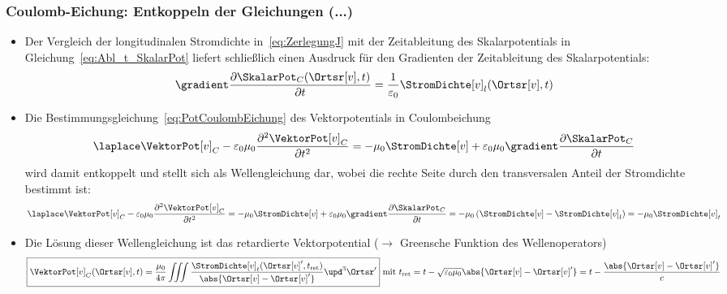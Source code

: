     \begin{frame}
  \frametitle{Coulomb-Eichung: Entkoppeln der Gleichungen (...)}
  \begin{itemize}[<+->]
  \item Der Vergleich der longitudinalen Stromdichte in~\eqref{eq:ZerlegungJ} mit der Zeitableitung des Skalarpotentials in Gleichung~\eqref{eq:Abl_t_SkalarPot} liefert schließlich einen Ausdruck für den Gradienten der Zeitableitung des Skalarpotentials:
    \begin{equation}
      \gradient \frac{\partial \SkalarPot_C (\Ortsr[v], t)}{\partial t} = \frac{1}{\varepsilon_0} \StromDichte[v]_l (\Ortsr[v], t)
    \end{equation}
  \item Die Bestimmungsgleichung~\eqref{eq:PotCoulombEichung} des Vektorpotentials in Coulombeichung
    \begin{equation*}
      \laplace\VektorPot[v]_C -\varepsilon_0 \mu_0\frac{\partial^2\VektorPot[v]_C}{\partial t^2} = -\mu_0\StromDichte[v] +\varepsilon_0\mu_0 \gradient\frac{\partial\SkalarPot_C}{\partial t}
    \end{equation*}
    wird damit entkoppelt und stellt sich als Wellengleichung dar, wobei die rechte Seite durch den transversalen Anteil der Stromdichte bestimmt ist:
    \begin{equation}
      \laplace\VektorPot[v]_C -\varepsilon_0 \mu_0\frac{\partial^2\VektorPot[v]_C}{\partial t^2} = -\mu_0\StromDichte[v] +\varepsilon_0\mu_0 \gradient\frac{\partial\SkalarPot_C}{\partial t} = -\mu_0\left( \StromDichte[v] - \StromDichte[v]_l\right) = -\mu_0 \StromDichte[v]_t
    \end{equation}
  \item Die Lösung dieser Wellengleichung ist das \alert{retardierte Vektorpotential} ($\to$ Greensche Funktion des Wellenoperators)
    \begin{equation}
     \boxed{ \VektorPot[v]_C(\Ortsr[v], t) = \frac{\mu_0}{4\pi} \iiint \frac{\StromDichte[v]_t (\Ortsr[v]^\prime, t_{\text{ret}})}{\abs{\Ortsr[v]-\Ortsr[v]^\prime}} \upd^3\Ortsr^\prime} \text{ mit } t_{\text{ret}} = t - \sqrt{\varepsilon_0\mu_0} \abs{\Ortsr[v]-\Ortsr[v]^\prime} = t - \frac{\abs{\Ortsr[v]-\Ortsr[v]^\prime}}{c}
      \end{equation}
      \end{itemize}
  \end{frame}

